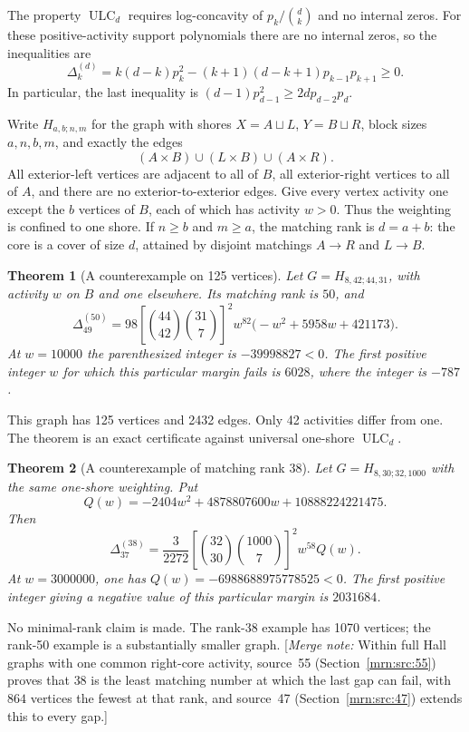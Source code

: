 \documentclass[11pt,a4paper]{article}
\newtheorem{theorem}{Theorem}[section]
\theoremstyle{remark}\newtheorem{remark}[theorem]{Remark}
\newcommand{\ULC}{\operatorname{ULC}}      %
\newcommand{\gap}{\Delta}                  %
\newcommand{\mnote}[1]{[\textit{Merge note:} #1]}
\begin{document}
The property $\ULC_d$ requires log-concavity of $p_k/\binom dk$ and no internal zeros. For these positive-activity support polynomials there are no internal zeros, so the inequalities are
\begin{equation}\label{mrn:u:os:eq:gap}
 \gap_k^{(d)}=k(d-k)p_k^2-(k+1)(d-k+1)p_{k-1}p_{k+1}\ge0.
\end{equation}
In particular, the last inequality is $(d-1)p_{d-1}^2\ge2dp_{d-2}p_d$.

Write $H_{a,b;n,m}$ for the graph with shores $X=A\sqcup L$, $Y=B\sqcup R$, block sizes $a,n,b,m$, and exactly the edges
\begin{equation}\label{mrn:u:os:eq:edges}
 (A\times B)\cup(L\times B)\cup(A\times R).
\end{equation}
All exterior-left vertices are adjacent to all of $B$, all exterior-right vertices to all of $A$, and there are no exterior-to-exterior edges. Give every vertex activity one except the $b$ vertices of $B$, each of which has activity $w>0$. Thus the weighting is confined to one shore. If $n\ge b$ and $m\ge a$, the matching rank is $d=a+b$: the core is a cover of size $d$, attained by disjoint matchings $A\to R$ and $L\to B$.

\begin{theorem}[A counterexample on 125 vertices]\label{mrn:u:os:thm:smallgraph}
Let $G=H_{8,42;44,31}$, with activity $w$ on $B$ and one elsewhere. Its matching rank is $50$, and
\begin{equation}\label{mrn:u:os:eq:cleanwitness}
 \gap_{49}^{(50)}
 =98\left[\binom{44}{42}\binom{31}{7}\right]^2
       w^{82}\bigl(-w^2+5958w+421173\bigr).
\end{equation}
At $w=10000$ the parenthesized integer is $-39998827<0$. The first positive integer $w$ for which this particular margin fails is $6028$, where the integer is $-787$.
\end{theorem}
This graph has 125 vertices and 2432 edges. Only 42 activities differ from one. The theorem is an exact certificate against universal one-shore $\ULC_d$.

\begin{theorem}[A counterexample of matching rank 38]\label{mrn:u:os:thm:smallrank}
Let $G=H_{8,30;32,1000}$ with the same one-shore weighting. Put
\[
 Q(w)=-2404w^2+4878807600w+10888224221475.
\]
Then
\begin{equation}\label{mrn:u:os:eq:rank38}
 \gap_{37}^{(38)}
 =\frac{3}{2272}\left[\binom{32}{30}\binom{1000}{7}\right]^2w^{58}Q(w).
\end{equation}
At $w=3000000$, one has $Q(w)=-6988688975778525<0$. The first positive integer giving a negative value of this particular margin is $2031684$.
\end{theorem}
No minimal-rank claim is made. The rank-38 example has 1070 vertices; the rank-50 example is a substantially smaller graph.
\mnote{Within full Hall graphs with one common right-core activity, source~55 (Section~\ref{mrn:src:55}) proves that $38$ is the least matching number at which the last gap can fail, with $864$ vertices the fewest at that rank, and source~47 (Section~\ref{mrn:src:47}) extends this to every gap.}
\end{document}
